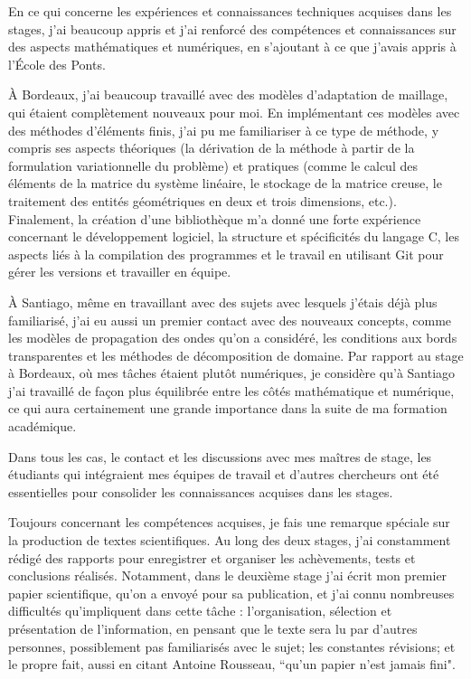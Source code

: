 \indent En ce qui concerne les expériences et connaissances techniques acquises dans les stages, j'ai beaucoup appris et j'ai renforcé des compétences et connaissances sur des aspects mathématiques et numériques, en s'ajoutant à ce que j'avais appris à l'École des Ponts.

\indent À Bordeaux, j'ai beaucoup travaillé avec des modèles d'adaptation de maillage, qui étaient complètement nouveaux pour moi. En implémentant ces modèles avec des méthodes d'éléments finis, j'ai pu me familiariser à ce type de méthode, y compris ses aspects théoriques (la dérivation de la méthode à partir de la formulation variationnelle du problème) et pratiques (comme le calcul des éléments de la matrice du système linéaire, le stockage de la matrice creuse, le traitement des entités géométriques en deux et trois dimensions, etc.). Finalement, la création d'une bibliothèque m'a donné une forte expérience concernant le développement logiciel, la structure et spécificités du langage C, les aspects liés à la compilation des programmes et le travail en utilisant Git pour gérer les versions et travailler en équipe.

\indent À Santiago, même en travaillant avec des sujets avec lesquels j'étais déjà plus familiarisé, j'ai eu aussi un premier contact avec des nouveaux concepts, comme les modèles de propagation des ondes qu'on a considéré, les conditions aux bords transparentes et les méthodes de décomposition de domaine. Par rapport au stage à Bordeaux, où mes tâches étaient plutôt numériques, je considère qu'à Santiago j'ai travaillé de façon plus équilibrée entre les côtés mathématique et numérique, ce qui aura certainement une grande importance dans la suite de ma formation académique.

\indent Dans tous les cas, le contact et les discussions avec mes maîtres de stage, les étudiants qui intégraient mes équipes de travail et d'autres chercheurs ont été essentielles pour consolider les connaissances acquises dans les stages.

\indent Toujours concernant les compétences acquises, je fais une remarque spéciale sur la production de textes scientifiques. Au long des deux stages, j'ai constamment rédigé des rapports pour enregistrer et organiser les achèvements, tests et conclusions réalisés. Notamment, dans le deuxième stage j'ai écrit mon premier papier scientifique, qu'on a envoyé pour sa publication, et j'ai connu nombreuses difficultés qu'impliquent dans cette tâche : l'organisation, sélection et présentation de l'information, en pensant que le texte sera lu par d'autres personnes, possiblement pas familiarisés avec le sujet; les constantes révisions; et le propre fait, aussi en citant Antoine Rousseau, ``qu'un papier n'est jamais fini".

